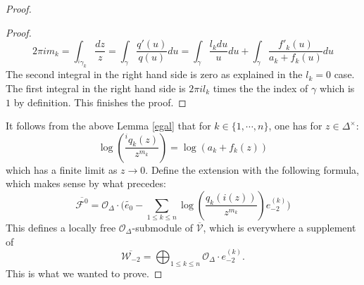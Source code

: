 \documentclass[10pt,a4paper]{amsart}
\begin{document}
\begin{proof}
\begin{proof}
\[
2 \pi i m_k = \int_{^i\gamma_k} \frac{dz}{z} = \int_\gamma \frac{q'(u)}{q(u)}du = \int_\gamma \frac{l_k du}{u} du + \int_\gamma \frac{f'_k(u)}{a_k + f_k(u)}du
\]
The second integral in the right hand side is zero as explained in the $l_k = 0$ case. The first integral in the right hand side is $2 \pi i l_k$ times the the index of $\gamma$ which is $1$ by definition. This finishes the proof.
\end{proof}
It follows from the above Lemma \ref{egal} that for $k \in \{1,\cdots, n\}$, one has for $z \in \Delta^\times$:
\[
\log(\frac{^iq_k(z)}{z^{m_k}}) = \log(a_k + f_k(z))
\]
which has a finite limit as $z \rightarrow 0$. Define the extension with the following formula, which makes sense by what precedes:
\[
\overline{\mathcal{F}^0} = \mathcal{O}_\Delta \cdot \Big( \tilde{e_0} - \sum_{1 \leqslant k \leqslant n} \log(\frac{q_k(i(z))}{z^{m_k}})e_{-2}^{(k)} \Big)
\]
This defines a locally free $\mathcal{O}_\Delta$-submodule of $\overline{\mathcal{V}}$, which is everywhere a supplement of 
\[
\overline{\mathcal{W}_{-2}} = \bigoplus_{1 \leqslant k \leqslant n} \mathcal{O}_{\Delta} \cdot e_{-2}^{(k)}.
\]
This is what we wanted to prove.
\end{proof}
\end{document}
